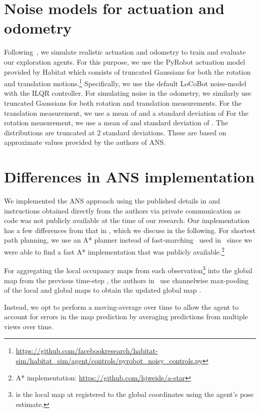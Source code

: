 \documentclass[runningheads]{llncs}
\begin{document}
\section{Noise models for actuation and odometry}
\label{sec:noise_models}
Following~\cite{chaplot2020learning}, we simulate realistic actuation and odometry to train and evaluate our exploration agents. For this purpose, we use the PyRobot actuation model provided by Habitat which consists of truncated Gaussians for both the rotation and translation motions.\footnote{\url{https://github.com/facebookresearch/habitat-sim/habitat_sim/agent/controls/pyrobot_noisy_controls.py}} Specifically, we use the default LoCoBot noise-model with the ILQR controller. For simulating noise in the odometry, we similarly use truncated Gaussians for both rotation and translation measurements. For the translation measurement, we use a mean of  and a standard deviation of  For the rotation measurement, we use a mean of  and standard deviation of . The distributions are truncated at 2 standard deviations. These are based on approximate values provided by the authors of ANS.


\section{Differences in ANS implementation}
\label{sec:differences_ans}
We implemented the ANS approach using the published details in \cite{chaplot2020learning} and instructions obtained directly from the authors via private communication as code was not publicly available at the time of our research. Our implementation has a few differences from that in \cite{chaplot2020learning}, which we discuss in the following. For shortest path planning, we use an A* planner instead of fast-marching~\cite{sethian1996fast} used in~\cite{chaplot2020learning} since we were able to find a fast A* implementation that was publicly available.\footnote{A* implementation: \url{https://github.com/hjweide/a-star}}

For aggregating the local occupancy maps  from each observation\footnote{ is the local map at  registered to the global coordinates using the agent's pose estimate.} into the global map  from the previous time-step , the authors in~\cite{chaplot2020learning} use channelwise max-pooling of the local and global maps to obtain the updated global map .


Instead, we opt to perform a moving-average over time to allow the agent to account for errors in the map prediction by averaging predictions from multiple views over time.
\end{document}
